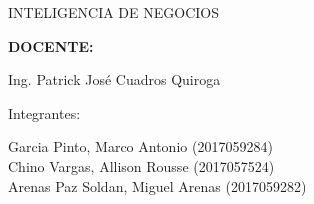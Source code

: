 \documentclass[12pt,letterpaper]{article}
\begin{document}
\begin{titlepage}
\begin{center}
\begin{large}
                INTELIGENCIA DE NEGOCIOS\\
            \end{large}
            \vspace*{0.3in}
            \begin{Large}
                \textbf{DOCENTE:} \\
            \end{Large}
            \vspace*{0.1in}
            \begin{large}
                Ing. Patrick José Cuadros Quiroga\\
            \end{large}
            \vspace*{0.2in}
            \vspace*{0.1in}
            \begin{large}
                Integrantes: \\
                \begin{flushleft}
                    Garcia Pinto, Marco Antonio 			\hfill	(2017059284) \\
                    Chino Vargas, Allison Rousse  		\hfill	(2017057524) \\
                    Arenas Paz Soldan, Miguel Arenas  		\hfill	(2017059282) \\
                \end{flushleft}
            \end{large}
        \end{center}
    \end{titlepage}
\end{document}
